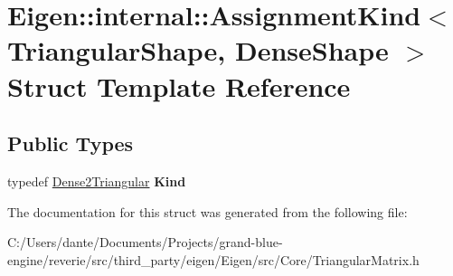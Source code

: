\hypertarget{struct_eigen_1_1internal_1_1_assignment_kind_3_01_triangular_shape_00_01_dense_shape_01_4}{}\section{Eigen\+::internal\+::Assignment\+Kind$<$ Triangular\+Shape, Dense\+Shape $>$ Struct Template Reference}
\label{struct_eigen_1_1internal_1_1_assignment_kind_3_01_triangular_shape_00_01_dense_shape_01_4}
\subsection*{Public Types}
\begin{DoxyCompactItemize}
\item 
\mbox{\label{struct_eigen_1_1internal_1_1_assignment_kind_3_01_triangular_shape_00_01_dense_shape_01_4_afe17b0030002e7f1ae42f6200a80f220}} 
typedef \mbox{\hyperlink{struct_eigen_1_1internal_1_1_dense2_triangular}{Dense2\+Triangular}} {\bfseries Kind}
\end{DoxyCompactItemize}


The documentation for this struct was generated from the following file\+:\begin{DoxyCompactItemize}
\item 
C\+:/\+Users/dante/\+Documents/\+Projects/grand-\/blue-\/engine/reverie/src/third\+\_\+party/eigen/\+Eigen/src/\+Core/Triangular\+Matrix.\+h\end{DoxyCompactItemize}
